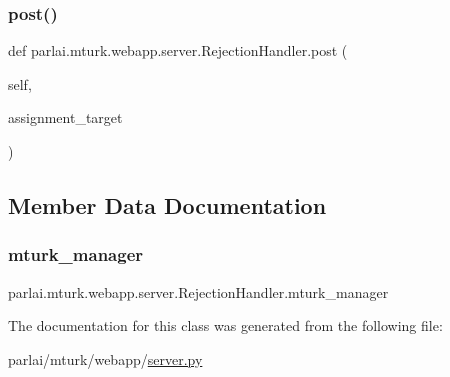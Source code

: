\subsubsection{\texorpdfstring{post()}{post()}}
{\footnotesize\ttfamily def parlai.\+mturk.\+webapp.\+server.\+Rejection\+Handler.\+post (\begin{DoxyParamCaption}\item[{}]{self,  }\item[{}]{assignment\+\_\+target }\end{DoxyParamCaption})}



\subsection{Member Data Documentation}
\mbox{\label{classparlai_1_1mturk_1_1webapp_1_1server_1_1RejectionHandler_add298625ab3b54fd34cc774e7eeb9e7c}} 
\subsubsection{\texorpdfstring{mturk\+\_\+manager}{mturk\_manager}}
{\footnotesize\ttfamily parlai.\+mturk.\+webapp.\+server.\+Rejection\+Handler.\+mturk\+\_\+manager}



The documentation for this class was generated from the following file\+:\begin{DoxyCompactItemize}
\item 
parlai/mturk/webapp/\hyperlink{server_8py}{server.\+py}\end{DoxyCompactItemize}
